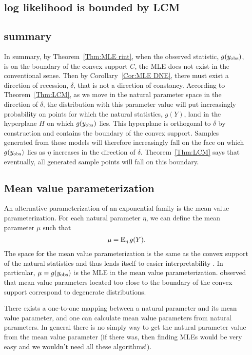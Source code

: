 \subsection{log likelihood is bounded by LCM}
\subsection{summary}



In summary, by Theorem~\ref{Thm:MLE rint}, when the observed statistic, $g(y_{\textrm{obs}})$, is 
on the boundary of the convex support $C$, the MLE does not exist in the conventional 
sense.
Then by Corollary~\ref{Cor:MLE DNE}, there must exist a direction of recession, $
\delta$, that is not a direction of constancy.  
According to Theorem~\ref{Thm:LCM}, as we move in the natural parameter space in the 
direction of $\delta$, the distribution with this parameter value will put 
increasingly probability on points for which the natural statistics, $g(Y)$, land in 
the hyperplane $H$ on which $g(y_{\textrm{obs}})$ lies.  This hyperplane is orthogonal to $\delta
$ by construction and contains the boundary of the convex support.  Samples generated 
from these models will therefore increasingly fall on the face on which $g(y_{\textrm{obs}})$ 
lies as $\eta$ increases in the direction of $\delta$.  Theorem~\ref{Thm:LCM} says 
that eventually, all generated sample points will fall on this boundary.


\subsection{Mean value parameterization}

An alternative parameterization of an exponential family is the mean value 
parameterization.  For each natural parameter $\eta$, we can define the mean parameter 
$\mu$ such that
\begin{align*}
	\mu = \operatorname{E}_\eta g(Y).
\end{align*}
The space for the mean value parameterization is the same as the convex support of the 
natural statistics and thus lends itself to easier interpretability  \citep
{Handcock:degeneracy, Rinaldo:2009}.  In particular, $\mu = g(y_{\textrm{obs}})$ is the MLE in 
the mean value parameterization.  \citeauthor{Handcock:degeneracy} observed that mean 
value parameters located too close to the boundary of the convex support correspond to 
degenerate distributions.  

There exists a one-to-one mapping between a natural parameter and its mean value 
parameter, and one can calculate mean value parameters from natural parameters. In 
general there is no simply way to get the natural parameter value from the mean value 
parameter (if there was, then finding MLEs would be very easy and we wouldn't need all 
these algorithms!).

